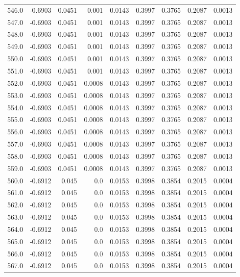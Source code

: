 \begin{longtable}{lrrrrrrrr}
546.0 & -0.6903 & 0.0451 & 0.001 & 0.0143 & 0.3997 & 0.3765 & 0.2087 & 0.0013 \\
547.0 & -0.6903 & 0.0451 & 0.001 & 0.0143 & 0.3997 & 0.3765 & 0.2087 & 0.0013 \\
548.0 & -0.6903 & 0.0451 & 0.001 & 0.0143 & 0.3997 & 0.3765 & 0.2087 & 0.0013 \\
549.0 & -0.6903 & 0.0451 & 0.001 & 0.0143 & 0.3997 & 0.3765 & 0.2087 & 0.0013 \\
550.0 & -0.6903 & 0.0451 & 0.001 & 0.0143 & 0.3997 & 0.3765 & 0.2087 & 0.0013 \\
551.0 & -0.6903 & 0.0451 & 0.001 & 0.0143 & 0.3997 & 0.3765 & 0.2087 & 0.0013 \\
552.0 & -0.6903 & 0.0451 & 0.0008 & 0.0143 & 0.3997 & 0.3765 & 0.2087 & 0.0013 \\
553.0 & -0.6903 & 0.0451 & 0.0008 & 0.0143 & 0.3997 & 0.3765 & 0.2087 & 0.0013 \\
554.0 & -0.6903 & 0.0451 & 0.0008 & 0.0143 & 0.3997 & 0.3765 & 0.2087 & 0.0013 \\
555.0 & -0.6903 & 0.0451 & 0.0008 & 0.0143 & 0.3997 & 0.3765 & 0.2087 & 0.0013 \\
556.0 & -0.6903 & 0.0451 & 0.0008 & 0.0143 & 0.3997 & 0.3765 & 0.2087 & 0.0013 \\
557.0 & -0.6903 & 0.0451 & 0.0008 & 0.0143 & 0.3997 & 0.3765 & 0.2087 & 0.0013 \\
558.0 & -0.6903 & 0.0451 & 0.0008 & 0.0143 & 0.3997 & 0.3765 & 0.2087 & 0.0013 \\
559.0 & -0.6903 & 0.0451 & 0.0008 & 0.0143 & 0.3997 & 0.3765 & 0.2087 & 0.0013 \\
560.0 & -0.6912 & 0.045 & 0.0 & 0.0153 & 0.3998 & 0.3854 & 0.2015 & 0.0004 \\
561.0 & -0.6912 & 0.045 & 0.0 & 0.0153 & 0.3998 & 0.3854 & 0.2015 & 0.0004 \\
562.0 & -0.6912 & 0.045 & 0.0 & 0.0153 & 0.3998 & 0.3854 & 0.2015 & 0.0004 \\
563.0 & -0.6912 & 0.045 & 0.0 & 0.0153 & 0.3998 & 0.3854 & 0.2015 & 0.0004 \\
564.0 & -0.6912 & 0.045 & 0.0 & 0.0153 & 0.3998 & 0.3854 & 0.2015 & 0.0004 \\
565.0 & -0.6912 & 0.045 & 0.0 & 0.0153 & 0.3998 & 0.3854 & 0.2015 & 0.0004 \\
566.0 & -0.6912 & 0.045 & 0.0 & 0.0153 & 0.3998 & 0.3854 & 0.2015 & 0.0004 \\
567.0 & -0.6912 & 0.045 & 0.0 & 0.0153 & 0.3998 & 0.3854 & 0.2015 & 0.0004 \\

\end{longtable}
